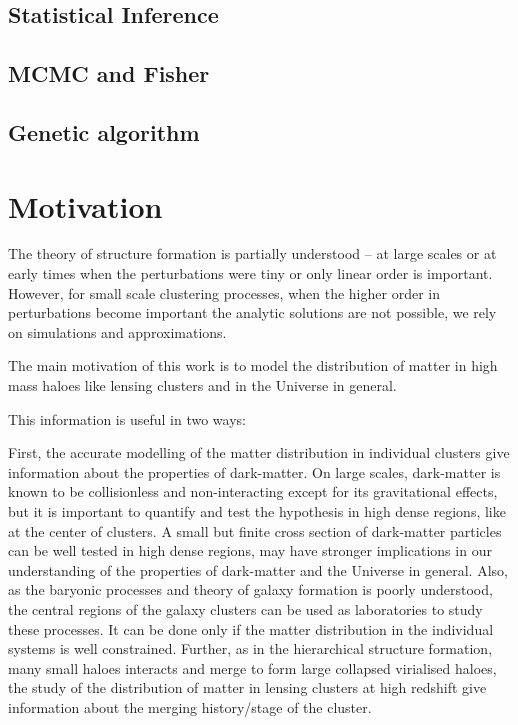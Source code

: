 \subsection{Statistical Inference}



\subsection{MCMC and Fisher}
\subsection{Genetic algorithm}

\clearpage
\section{Motivation}

The theory of structure formation is partially understood --  at large scales 
or at early times when the perturbations were tiny or only linear order is important. 
However, for small scale clustering processes, when the higher order in perturbations 
become important the analytic solutions are not possible, we rely on simulations and 
approximations. 

The main motivation of this work is to model the distribution of matter in high mass
haloes like lensing clusters and in the Universe in general. 

This information is useful in two ways: 

First, the accurate modelling of the matter distribution in individual clusters
give information about the properties of dark-matter. On large scales, dark-matter
is known to be collisionless and non-interacting except for its gravitational effects,
but it is important to quantify and test the hypothesis in high dense regions, like
at the center of clusters. A small but finite cross section of dark-matter particles
can be well tested in high dense regions, may have stronger implications in our 
understanding of the properties of dark-matter and the Universe in general.  
Also, as the baryonic processes and theory of galaxy
formation is poorly understood, the central regions of the galaxy clusters can be 
used as laboratories to study these processes. It can be done only if the matter 
distribution in the individual systems is well constrained. 
Further, as in the hierarchical structure formation, many small haloes interacts and
merge to form large collapsed virialised haloes, the study of the distribution of 
matter in lensing clusters at high redshift give information about the merging
history/stage of the cluster. 

